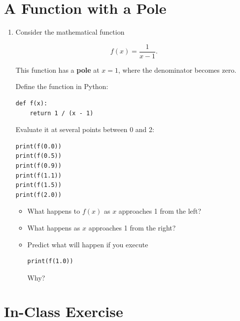\documentclass{article}
\begin{document}
\section{A Function with a Pole}

\begin{enumerate}

\item Consider the mathematical function

\[
f(x)=\frac{1}{x-1}.
\]

This function has a \textbf{pole} at $x=1$, where the
denominator becomes zero.

Define the function in Python:

\begin{verbatim}
def f(x):
    return 1 / (x - 1)
\end{verbatim}

Evaluate it at several points between 0 and 2:

\begin{verbatim}
print(f(0.0))
print(f(0.5))
print(f(0.9))
print(f(1.1))
print(f(1.5))
print(f(2.0))
\end{verbatim}

\begin{itemize}

\item What happens to $f(x)$ as $x$ approaches 1 from
the left?

\item What happens as $x$ approaches 1 from the right?

\item Predict what will happen if you execute

\begin{verbatim}
print(f(1.0))
\end{verbatim}

Why?

\end{itemize}

\end{enumerate}


\section{In-Class Exercise}
\end{document}
